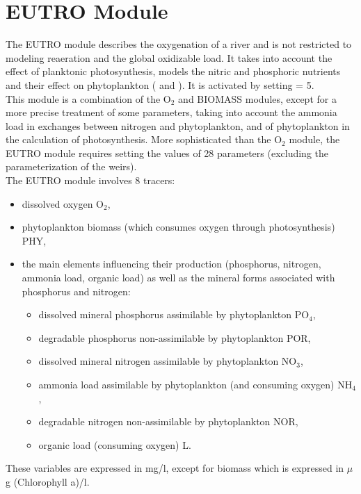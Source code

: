 \chapter{EUTRO Module}

The EUTRO module describes the oxygenation of a river and
is not restricted to modeling reaeration and the global oxidizable load.
It takes into account the effect of planktonic photosynthesis,
models the nitric and phosphoric nutrients and their effect
on phytoplankton (\cite{gosse_doubs_1989} and \cite{gosse_doubs_1983}).
It is activated by setting  = 5.\\

This module is a combination of the O$_2$ and BIOMASS modules,
except for a more precise treatment of some parameters,
taking into account the ammonia load in exchanges between nitrogen and phytoplankton,
and of phytoplankton in the calculation of photosynthesis.
More sophisticated than the O$_2$ module, the EUTRO module requires setting
the values of 28 parameters (excluding the parameterization of the weirs).\\

The EUTRO module involves 8 tracers:

\begin{itemize}
\item dissolved oxygen O$_2$,
\item phytoplankton biomass (which consumes oxygen through photosynthesis) PHY,
\item the main elements influencing their production
  (phosphorus, nitrogen, ammonia load, organic load)
  as well as the mineral forms associated with phosphorus and nitrogen:
\begin{itemize}
\item dissolved mineral phosphorus assimilable by phytoplankton PO$_4$,
\item degradable phosphorus non-assimilable by phytoplankton POR,
\item dissolved mineral nitrogen assimilable by phytoplankton NO$_3$,
\item ammonia load assimilable by phytoplankton (and consuming oxygen) NH$_4$,
\item degradable nitrogen non-assimilable by phytoplankton NOR,
\item organic load (consuming oxygen) L.
\end{itemize}
\end{itemize}

These variables are expressed in mg/l, except for biomass which is expressed in $\mu$g (Chlorophyll a)/l.\\

